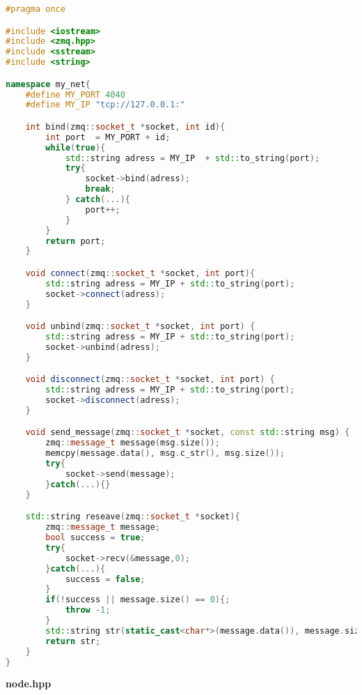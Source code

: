 \documentclass[pdf, unicode, 12pt, a4paper,oneside,fleqn]{article}
\begin{document}
\begin{lstlisting}[language=C++]
#pragma once

#include <iostream>
#include <zmq.hpp>
#include <sstream>
#include <string>

namespace my_net{
    #define MY_PORT 4040
    #define MY_IP "tcp://127.0.0.1:"

    int bind(zmq::socket_t *socket, int id){
        int port  = MY_PORT + id;
        while(true){
            std::string adress = MY_IP  + std::to_string(port);
            try{
                socket->bind(adress);
                break;
            } catch(...){
                port++;
            }    
        }
        return port;
    }

    void connect(zmq::socket_t *socket, int port){
        std::string adress = MY_IP + std::to_string(port);
        socket->connect(adress);
    }

    void unbind(zmq::socket_t *socket, int port) {
        std::string adress = MY_IP + std::to_string(port);
        socket->unbind(adress);
    }

    void disconnect(zmq::socket_t *socket, int port) {
        std::string adress = MY_IP + std::to_string(port);
        socket->disconnect(adress);
    }

    void send_message(zmq::socket_t *socket, const std::string msg) {
        zmq::message_t message(msg.size());
        memcpy(message.data(), msg.c_str(), msg.size());
        try{
            socket->send(message);
        }catch(...){}
    }

    std::string reseave(zmq::socket_t *socket){
        zmq::message_t message;
        bool success = true;
        try{
            socket->recv(&message,0);
        }catch(...){
            success = false;
        }
        if(!success || message.size() == 0){;
            throw -1;
        }
        std::string str(static_cast<char*>(message.data()), message.size());
        return str;
    }
}
\end{lstlisting}

{\large\textbf{node.hpp}}
\end{document}

